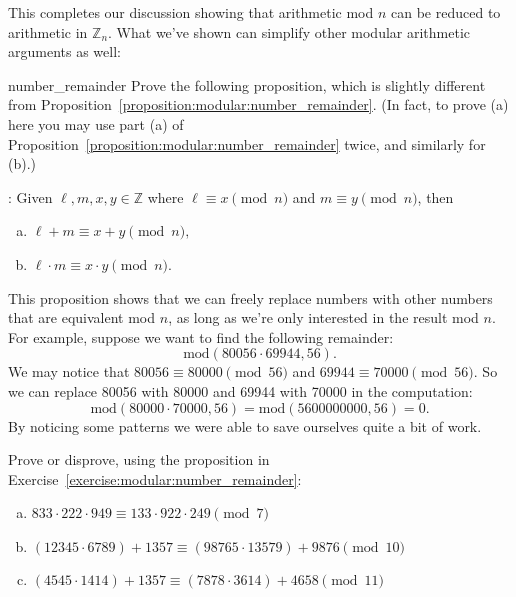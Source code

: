 This completes our discussion showing that arithmetic mod $n$ can be reduced to arithmetic in ${\mathbb Z}_n$.  What we've shown can simplify other modular arithmetic arguments as well:

\begin{exercise}{number_remainder}
Prove the following proposition, which is slightly different from Proposition~\ref{proposition:modular:number_remainder}.  (In fact, to prove (a) here you may use  part (a) of   Proposition~\ref{proposition:modular:number_remainder} twice, and similarly for (b).)

: Given $\ell,m,x,y \in {\mathbb Z}$ where $\ell \equiv x \pmod{n}$ and $m \equiv y \pmod{n}$, then 

\begin{enumerate}[(a)]
\item
$\ell + m \equiv x + y \pmod{n},$ 
\item
$\ell \cdot m \equiv x \cdot y \pmod{n}$.
\end{enumerate}
\end{exercise}

This proposition shows that we can freely replace numbers with other numbers that are equivalent mod $n$,  as long as we're only interested in the result mod $n$. For example, suppose we  want to find the following remainder:  
\[
\text{mod}(80056 \cdot 69944, 56).  
\]
We may notice that $80056 \equiv 80000 \pmod{56}$ and $69944 \equiv 70000 \pmod{56}$.  So we can replace 80056 with 80000 and 69944 with 70000 in the computation:
\[
  \text{mod}(80000 \cdot 70000, 56)= \text{mod}(5600000000, 56)=0.
\]
By noticing some patterns we were able to save ourselves quite a bit of work.

\begin{exercise}{}
Prove or disprove, using the proposition in Exercise~\ref{exercise:modular:number_remainder}:
\begin{enumerate}[(a)]
\item
$833 \cdot 222 \cdot 949 \equiv 133 \cdot  922 \cdot 249 \pmod{7}$
\item
$(12345 \cdot 6789) + 1357 \equiv (98765 \cdot 13579) + 9876 \pmod{10}$
\item
$(4545 \cdot 1414) + 1357 \equiv (7878 \cdot 3614) + 4658 \pmod{11}$

\end{enumerate}
\end{exercise}


